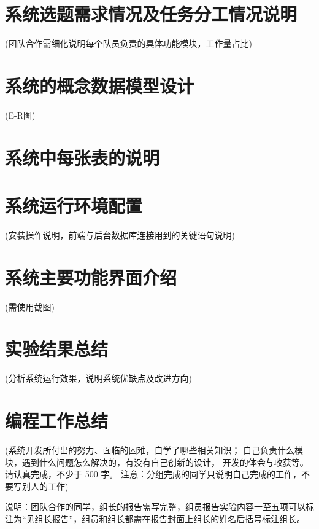 \section{系统选题需求情况及任务分工情况说明}
(团队合作需细化说明每个队员负责的具体功能模块，工作量占比)

\section{系统的概念数据模型设计}
(E-R图)

\section{系统中每张表的说明}

\section{系统运行环境配置}
(安装操作说明，前端与后台数据库连接用到的关键语句说明)

\section{系统主要功能界面介绍}
(需使用截图)

\section{实验结果总结}
(分析系统运行效果，说明系统优缺点及改进方向)

\section{编程工作总结}
(系统开发所付出的努力、面临的困难，自学了哪些相关知识；
自己负责什么模块，遇到什么问题怎么解决的，有没有自己创新的设计，
开发的体会与收获等。请认真完成，不少于 500 字。
注意：分组完成的同学只说明自己完成的工作，不要写别人的工作)

说明：团队合作的同学，组长的报告需写完整，组员报告实验内容一至五项可以标
注为``见组长报告''，组员和组长都需在报告封面上组长的姓名后括号标注组长。
